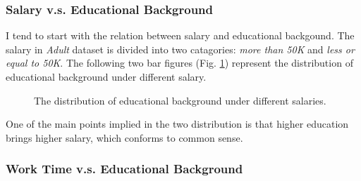 \documentclass[12pt,a4paper]{article}
\theoremstyle{definition}
\begin{document}
\subsubsection{Salary v.s. Educational Background}
\label{sec::salary_vs_edu}
I tend to start with the relation between salary and educational backgound. The salary in \textit{Adult} dataset is divided into two catagories: \textit{more than 50K} and \textit{less or equal to 50K}. The following two bar figures (Fig. \ref{fig::single_salary}) represent the distribution of educational background under different salary.

\begin{figure}[H]
	\centering
	\caption{The distribution of educational background under different salaries.}
	\label{fig::single_salary}
\end{figure}

One of the main points implied in the two distribution is that higher education brings higher salary, which conforms to common sense.

\subsubsection{Work Time v.s. Educational Background}
\end{document}
